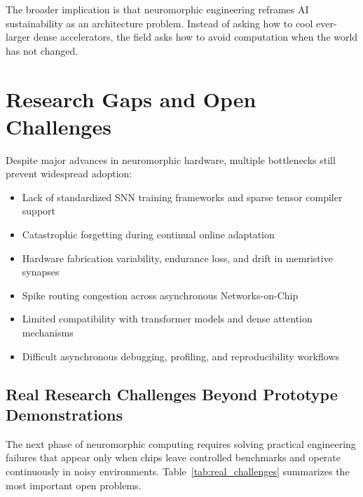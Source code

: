 \documentclass[11pt]{article}
\begin{document}
The broader implication is that neuromorphic engineering reframes AI sustainability as an architecture problem. Instead of asking how to cool ever-larger dense accelerators, the field asks how to avoid computation when the world has not changed.

\section{Research Gaps and Open Challenges}

\begin{researchbox}
Despite major advances in neuromorphic hardware, multiple bottlenecks still prevent widespread adoption:
\begin{itemize}
    \item Lack of standardized SNN training frameworks and sparse tensor compiler support
    \item Catastrophic forgetting during continual online adaptation
    \item Hardware fabrication variability, endurance loss, and drift in memristive synapses
    \item Spike routing congestion across asynchronous Networks-on-Chip
    \item Limited compatibility with transformer models and dense attention mechanisms
    \item Difficult asynchronous debugging, profiling, and reproducibility workflows
\end{itemize}
\end{researchbox}

\subsection{Real Research Challenges Beyond Prototype Demonstrations}
The next phase of neuromorphic computing requires solving practical engineering failures that appear only when chips leave controlled benchmarks and operate continuously in noisy environments. Table~\ref{tab:real_challenges} summarizes the most important open problems.
\end{document}
